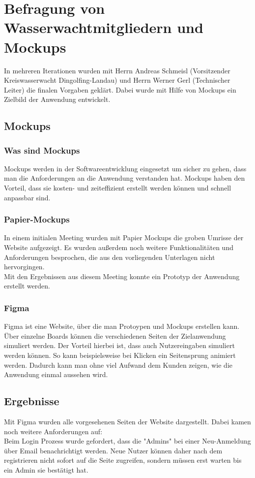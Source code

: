 \documentclass[fontsize=12pt,openright,oneside,paper=a4,BCOR=1cm]{scrbook}
\begin{document}
\section{Befragung von Wasserwachtmitgliedern und Mockups}
In mehreren Iterationen wurden mit Herrn Andreas Schmeisl (Vorsitzender Kreiswasserwacht Dingolfing-Landau) und Herrn Werner Gerl (Technischer Leiter) die finalen Vorgaben geklärt. Dabei wurde mit Hilfe von Mockups ein Zielbild der Anwendung entwickelt. 
\subsection{Mockups}
\subsubsection{Was sind Mockups}
Mockups werden in der Softwareentwicklung eingesetzt um sicher zu gehen, dass man die Anforderungen an die Anwendung verstanden hat. Mockups haben den Vorteil, dass sie kosten- und zeiteffizient erstellt werden können und schnell anpassbar sind.

\subsubsection{Papier-Mockups}
In einem initialen Meeting wurden mit Papier Mockups die groben Umrisse der Website aufgezeigt. Es wurden außerdem noch weitere Funktionalitäten und Anforderungen besprochen, die aus den vorliegenden Unterlagen nicht hervorgingen. \\
Mit den Ergebnissen aus diesem Meeting konnte ein Prototyp der Anwendung erstellt werden.


\subsubsection{Figma}
Figma ist eine Website, über die man Protoypen und Mockups erstellen kann. Über einzelne Boards können die verschiedenen Seiten der Zielanwendung simuliert werden. Der Vorteil hierbei ist, dass auch Nutzereingaben simuliert werden können. So kann beispielsweise bei Klicken ein Seitensprung animiert werden. Dadurch kann man ohne viel Aufwand dem Kunden zeigen, wie die Anwendung einmal aussehen wird. 

\subsection{Ergebnisse}
Mit Figma wurden alle vorgesehenen Seiten der Website dargestellt. Dabei kamen noch weitere Anforderungen auf: \\
Beim Login Prozess wurde gefordert, dass die "Admins" bei einer Neu-Anmeldung über Email benachrichtigt werden. Neue Nutzer können daher nach dem registrieren nicht sofort auf die Seite zugreifen, sondern müssen erst warten bis ein Admin sie bestätigt hat.\\
\end{document}
